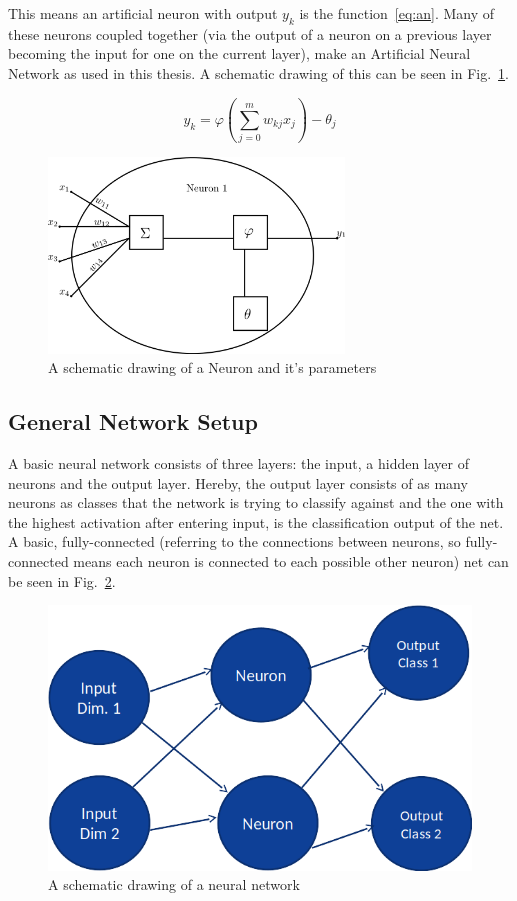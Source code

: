 This means an artificial neuron with output \(y_k\) is the function~\ref{eq:an}. Many of these neurons coupled together (via the output of a neuron on a previous layer becoming the input for one on the current layer), make an Artificial Neural Network as used in this thesis. A schematic drawing of this can be seen in Fig.~\ref{fig:neuron}.

\begin{equation}
y_k = \varphi(\sum_{j=0}^{m} w_{kj}x_j) - \theta_j
\label{eq:an}
\end{equation}

\begin{figure}[h!]
\label{fig:neuron}
\caption{A schematic drawing of a Neuron and it's parameters}
\centering
\includegraphics[width=0.7\textwidth]{images/neuron.png}
\end{figure}

\subsection{General Network Setup}
\label{sec:fund:netSetup}

A basic neural network consists of three layers: the input, a hidden layer of neurons and the output layer. Hereby, the output layer consists of as many neurons as classes that the network is trying to classify against and the one with the highest activation after entering input, is the classification output of the net.  A basic, fully-connected (referring to the connections between neurons, so fully-connected means each neuron is connected to each possible other neuron) net can be seen in Fig.~\ref{fig:net}.

\begin{figure}
\label{fig:net}
\caption{A schematic drawing of a neural network}
\centering
\includegraphics{images/net.png}
\end{figure}

